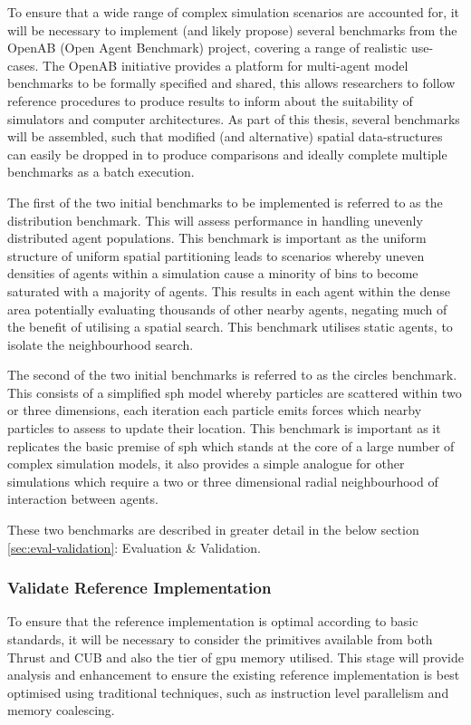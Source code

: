         To ensure that a wide range of complex simulation scenarios are accounted for, it will be necessary to implement (and likely propose) several benchmarks from the OpenAB (Open Agent Benchmark) project, covering a range of realistic use-cases. The OpenAB initiative provides a platform for multi-agent model benchmarks to be formally specified and shared, this allows researchers to follow reference procedures to produce results to inform about the suitability of simulators and computer architectures. As part of this thesis, several benchmarks will be assembled, such that modified (and alternative) spatial data-structures can easily be dropped in to produce comparisons and ideally complete multiple benchmarks as a batch execution.
        
        The first of the two initial benchmarks to be implemented is referred to as the distribution benchmark. This will assess performance in handling unevenly distributed agent populations. This benchmark is important as the uniform structure of uniform spatial partitioning leads to scenarios whereby uneven densities of agents within a simulation cause a minority of bins to become saturated with a majority of agents. This results in each agent within the dense area potentially evaluating thousands of other nearby agents, negating much of the benefit of utilising a spatial search. This benchmark utilises static agents, to isolate the neighbourhood search.
        
        The second of the two initial benchmarks is referred to as the circles benchmark. This consists of a simplified \gls{sph} model whereby particles are scattered within two or three dimensions, each iteration each particle emits forces which nearby particles to assess to update their location. This benchmark is important as it replicates the basic premise of \gls{sph} which stands at the core of a large number of complex simulation models, it also provides a simple analogue for other simulations which require a two or three dimensional radial neighbourhood of interaction between agents.
        
        These two benchmarks are described in greater detail in the below section \ref{sec:eval-validation}: Evaluation \& Validation.
        
      \subsubsection*{Validate Reference Implementation}
        To ensure that the reference implementation is optimal according to basic standards, it will be necessary to consider the primitives available from both Thrust and CUB and also the tier of \gls{gpu} memory utilised. This stage will provide analysis and enhancement to ensure the existing reference implementation is best optimised using traditional techniques, such as instruction level parallelism and memory coalescing.
        
